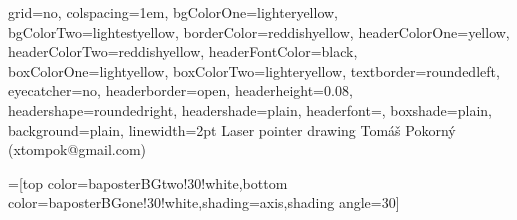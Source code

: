\documentclass[portrait,final]{baposter}
\begin{document}
\newlength{\leftimgwidth}
\begin{poster}%
  {
  grid=no,
  colspacing=1em,
  bgColorOne=lighteryellow,
  bgColorTwo=lightestyellow,
  borderColor=reddishyellow,
  headerColorOne=yellow,
  headerColorTwo=reddishyellow,
  headerFontColor=black,
  boxColorOne=lightyellow,
  boxColorTwo=lighteryellow,
  textborder=roundedleft,
  eyecatcher=no,
  headerborder=open,
  headerheight=0.08\textheight,
  headershape=roundedright,
  headershade=plain,
  headerfont=\Large\textsf, %
  boxshade=plain,
  background=plain,
  linewidth=2pt
  }
  {} %
  {\sf %
  Laser pointer drawing}
  {\sf %
  \vspace{1em} Tomáš Pokorný (xtompok@gmail.com)
  }
  {%
  }

  =[top color=baposterBGtwo!30!white,bottom color=baposterBGone!30!white,shading=axis,shading angle=30]

     \setlength{\leftimgwidth}{0.78em+8.0em}

    \newcommand{\colouredcircle}[1]{%
      \tikz{\useasboundingbox (-0.2em,-0.32em) rectangle(0.2em,0.32em); \draw[draw=black,fill=baposterBGone!80!black!#1!white,line width=0.03em] (0,0) circle(0.18em);}}



\end{poster}
\end{document}
